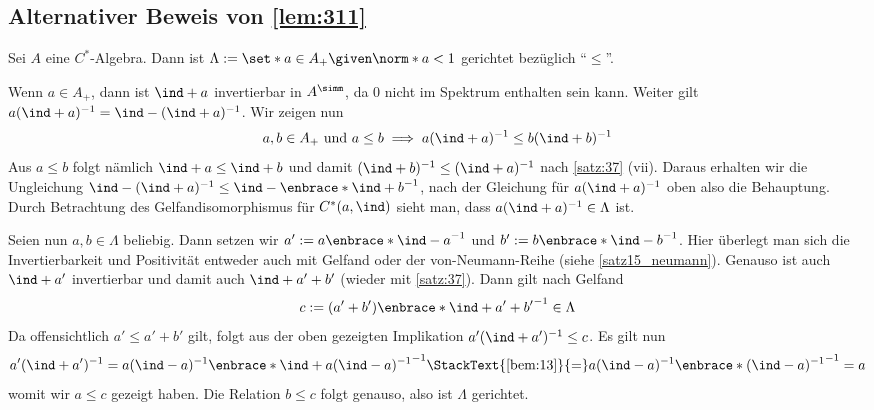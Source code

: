 \subsection{Alternativer Beweis von \autoref{lem:311}} %
\label{sub:alternativer_beweis_lemma_311}
Sei $A$ eine $C^*$-Algebra. Dann ist $\Lambda := \set*{a \in A_+ \given \norm*{a} < 1}$ gerichtet bezüglich \enquote{$\le$}.
\begin{beweis}
	Wenn $a \in A_+$, dann ist $\ind +a$ invertierbar in $A^\simm$, da $0$ nicht im Spektrum enthalten sein kann.
	Weiter gilt $a(\ind +a)^{-1} = \ind - (\ind +a)^{-1}$.
	Wir zeigen nun
	\[
		a,b \in A_+ \text{ und } a \le b \implies a(\ind+a)^{-1} \le b (\ind +b)^{-1} 
	\]
	Aus $a \le b$ folgt nämlich $\ind +a \le \ind +b$ und damit $(\ind +b)^{-1} \le (\ind +a)^{-1}$ nach \autoref{satz:37} (vii).
	Daraus erhalten wir die Ungleichung $\ind - (\ind +a)^{-1} \le \ind - \enbrace*{\ind +b}^{-1}$, nach der Gleichung für $a(\ind +a)^{-1}$ oben also die Behauptung.
	Durch Betrachtung des Gelfandisomorphismus für $C^*(a, \ind)$ sieht man, dass $a(\ind +a)^{-1} \in \Lambda$ ist.
	
	Seien nun $a,b \in \Lambda$ beliebig.
	Dann setzen wir $a' := a \enbrace*{\ind -a}^{-1}$ und $b' := b \enbrace*{\ind -b}^{-1}$. Hier überlegt man sich die Invertierbarkeit und Positivität entweder auch mit Gelfand oder der von-Neumann-Reihe (siehe \ref{satz15_neumann}).
	Genauso ist auch $\ind + a'$ invertierbar und damit auch $\ind + a' +b'$ (wieder mit \ref{satz:37}). 
	Dann gilt nach Gelfand
	\[
		c := (a' + b') \enbrace*{\ind + a' + b'}^{-1} \in \Lambda
	\]
	Da offensichtlich $a' \le a' + b'$ gilt, folgt aus der oben gezeigten Implikation $a'(\ind +a')^{-1} \le c$.
	Es gilt nun
	\[
		a'(\ind +a')^{-1} = a (\ind -a)^{-1} \enbrace*{\ind + a(\ind-a)^{-1}}^{-1} \StackText{\ref{bem:13}}{=} a (\ind -a)^{-1} \enbrace*{(\ind-a)^{-1}}^{-1} = a
	\]
	womit wir $a \le c$ gezeigt haben. 
	Die Relation $b \le c$ folgt genauso, also ist $\Lambda$ gerichtet.
\end{beweis}

